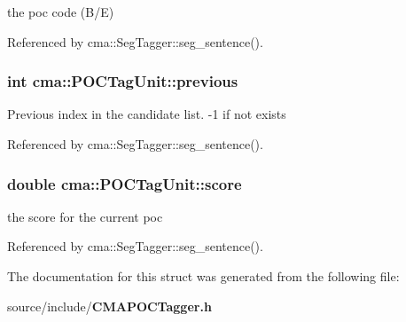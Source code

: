 the poc code (B/E) 

Referenced by cma::SegTagger::seg\_\-sentence().
\subsubsection[{previous}]{\setlength{\rightskip}{0pt plus 5cm}int {\bf cma::POCTagUnit::previous}}\label{structcma_1_1POCTagUnit_65a1e27d97dfa822fee58fbe3dc2a2a3}


Previous index in the candidate list. -1 if not exists 

Referenced by cma::SegTagger::seg\_\-sentence().
\subsubsection[{score}]{\setlength{\rightskip}{0pt plus 5cm}double {\bf cma::POCTagUnit::score}}\label{structcma_1_1POCTagUnit_dee6f742a3e599ee2093d224d447832f}


the score for the current poc 

Referenced by cma::SegTagger::seg\_\-sentence().

The documentation for this struct was generated from the following file:\begin{CompactItemize}
\item 
source/include/{\bf CMAPOCTagger.h}\end{CompactItemize}
